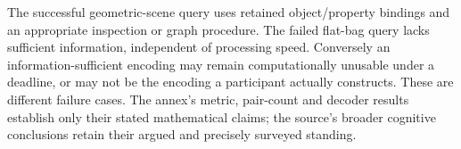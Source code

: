 The successful geometric-scene query uses retained object/property
bindings and an appropriate inspection or graph procedure. The
failed flat-bag query lacks sufficient information, independent
of processing speed. Conversely an information-sufficient encoding
may remain computationally unusable under a deadline, or may
not be the encoding a participant actually constructs. These
are different failure cases. The annex's metric, pair-count and
decoder results establish only their stated mathematical claims;
the source's broader cognitive conclusions retain their argued
and precisely surveyed standing.

